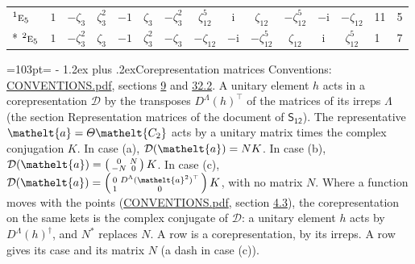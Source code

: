 \documentclass[10pt,a4paper]{article}
\makeatletter
\renewcommand\section{\@startsection{section}{1}{\z@}{-3ex plus -1ex minus -.2ex}%
  {1.2ex plus .2ex}{\normalfont\large\sffamily\bfseries\color{parttitle}}}
\newcommand{\needspace}[1]{\par\penalty-100\begingroup\dimen0=#1\relax\dimen2=\pagegoal
  \advance\dimen2-\pagetotal\ifdim\dimen0>\dimen2\relax\ifdim\dimen2>0pt\vfil\break\fi\fi
  \endgroup}
\numberwithin{equation}{section}
\newcommand{\eltfont}[1]{{\let\sigma\eltsigma\mathelt{#1}}}
\newcommand{\grp}[1]{\mathsf{#1}}
\newcommand{\irr}[1]{\text{\normalfont\scshape #1}}
\newcommand{\conjpair}[1]{{}^{#1}}
\newcommand{\elt}[1]{\eltfont{#1}}
\newcommand{\iunit}{\mathrm{i}}
\newcommand{\rootunity}[1]{\zeta_{#1}}
\makeatother
\begin{document}
{\begin{longtable}{@{}lccccccccccccll@{}}
$\conjpair{1}\irr{e}_{5}$ & $1$ & $-\rootunity{3}$ & $\rootunity{3}^{2}$ & $-1$ & $\rootunity{3}$ & $-\rootunity{3}^{2}$ & $\rootunity{12}^{5}$ & $\iunit{}$ & $\rootunity{12}$ & $-\rootunity{12}^{5}$ & $-\iunit{}$ & $-\rootunity{12}$ & 11 & 5\\*
$\conjpair{2}\irr{e}_{5}$ & $1$ & $-\rootunity{3}^{2}$ & $\rootunity{3}$ & $-1$ & $\rootunity{3}^{2}$ & $-\rootunity{3}$ & $-\rootunity{12}$ & $-\iunit{}$ & $-\rootunity{12}^{5}$ & $\rootunity{12}$ & $\iunit{}$ & $\rootunity{12}^{5}$ & 1 & 7\\
\bottomrule\end{longtable}}
\needspace{103pt}
\section{Corepresentation matrices}\label{s:corep_matrices}
Conventions: \href{../../CONVENTIONS.pdf}{CONVENTIONS.pdf}, sections \href{../../../rotation/CONVENTIONS.pdf\#conv.9}{9} and \href{../../CONVENTIONS.pdf\#conv.32.2}{32.2}.
A unitary element $h$ acts in a corepresentation $\mathcal{D}$ by the transposes $D^{\Lambda}(h)^{\top}$ of the matrices of its irreps $\Lambda$ (the section Representation matrices of the document of \href{../../../rotation/data/pdf/S12.pdf}{$\grp{S_{12}}$}). The representative $\elt{a} = \varTheta\elt{C_{2}}$ acts by a unitary matrix times the complex conjugation $K$.
In case (a), $\mathcal{D}(\elt{a}) = NK$. In case (b), $\mathcal{D}(\elt{a}) = \left(\begin{smallmatrix} 0 & N \\ -N & 0 \end{smallmatrix}\right) K$. In case (c), $\mathcal{D}(\elt{a}) = \left(\begin{smallmatrix} 0 & D^{\Lambda}(\elt{a}^2)^{\top} \\ 1 & 0 \end{smallmatrix}\right) K$, with no matrix $N$.
Where a function moves with the points (\href{../../CONVENTIONS.pdf}{CONVENTIONS.pdf}, section \href{../../../rotation/CONVENTIONS.pdf\#conv.4.3}{4.3}), the corepresentation on the same kets is the complex conjugate of $\mathcal{D}$: a unitary element $h$ acts by $D^{\Lambda}(h)^{\dagger}$, and $N^{*}$ replaces $N$.
A row is a corepresentation, by its irreps. A row gives its case and its matrix $N$ (a dash in case (c)).
\end{document}

